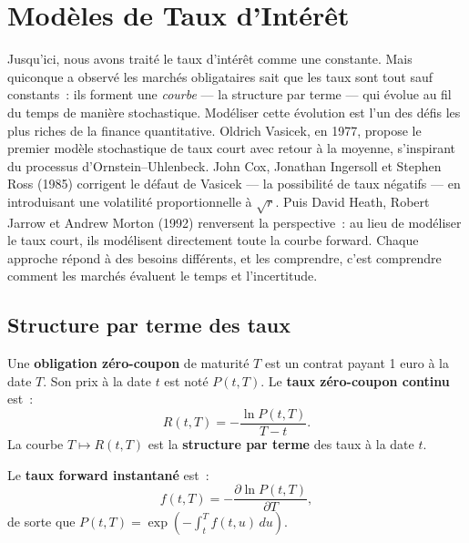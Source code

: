 \chapter{Mod\`eles de Taux d'Int\'er\^et}
\label{ch:taux}

Jusqu'ici, nous avons trait\'e le taux d'int\'er\^et comme une constante. Mais quiconque a observ\'e les march\'es obligataires sait que les taux sont tout sauf constants~: ils forment une \emph{courbe} --- la structure par terme --- qui \'evolue au fil du temps de mani\`ere stochastique. Mod\'eliser cette \'evolution est l'un des d\'efis les plus riches de la finance quantitative. Oldrich Vasicek, en 1977, propose le premier mod\`ele stochastique de taux court avec retour \`a la moyenne, s'inspirant du processus d'Ornstein--Uhlenbeck. John Cox, Jonathan Ingersoll et Stephen Ross (1985) corrigent le d\'efaut de Vasicek --- la possibilit\'e de taux n\'egatifs --- en introduisant une volatilit\'e proportionnelle \`a $\sqrt{r}$. Puis David Heath, Robert Jarrow et Andrew Morton (1992) renversent la perspective~: au lieu de mod\'eliser le taux court, ils mod\'elisent directement toute la courbe forward. Chaque approche r\'epond \`a des besoins diff\'erents, et les comprendre, c'est comprendre comment les march\'es \'evaluent le temps et l'incertitude.

\section{Structure par terme des taux}

\begin{definition}
Une \textbf{obligation z\'ero-coupon} de maturit\'e $T$ est un contrat
payant 1 euro \`a la date $T$. Son prix \`a la date $t$ est not\'e $P(t,T)$.
Le \textbf{taux z\'ero-coupon continu} est~:
\[
    R(t,T) = -\frac{\ln P(t,T)}{T - t}.
\]
La courbe $T \mapsto R(t,T)$ est la \textbf{structure par terme} des taux
\`a la date $t$.
\end{definition}

\begin{definition}
Le \textbf{taux forward instantan\'e} est~:
\[
    f(t,T) = -\frac{\partial \ln P(t,T)}{\partial T},
\]
de sorte que $P(t,T) = \exp\!\left(-\int_t^T f(t,u)\,du\right)$.
\end{definition}

